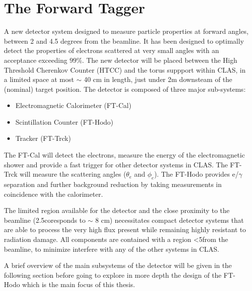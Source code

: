 \section{The Forward Tagger}
A new detector system designed to measure particle properties at forward angles, between 2 and 4.5 degrees from the beamline. It has been designed to optimally detect the properties of electrons scattered at very small angles with an acceptance exceeding $99\%$. \cite{FTTDR2012} The new detector will be placed between the High Threshold Cherenkov Counter (HTCC) and the torus suppport within CLAS, in a limited space at most $\sim$ 40 cm in length, just under 2m downsteam of the (nominal) target position. The detector is composed of three major sub-systems:

\begin{itemize}
	\item	Electromagnetic Calorimeter (FT-Cal)
	\item   Scintillation Counter (FT-Hodo)
	\item   Tracker (FT-Trck)
\end{itemize}

The FT-Cal will detect the electrons, measure the energy of the electromagnetic shower and provide a fast trigger for other detector systems in CLAS. The FT-Trck will measure the scattering angles ($\theta_{e}$ and $\phi_{e}$). The FT-Hodo provides e/$\gamma$ separation and further background reduction by taking measurements in coincidence with the calorimeter.

The limited region available for the detector and the close proximity to the beamline (2.5\textdegree coresponds to $\sim$ 8 cm) necessitates compact detector systems that are able to process the very high flux present while remaining highly resistant to radiation damage. All components are contained with a region \textless5\textdegree from the beamline, to minimize interfere with any of the other systems in CLAS. 

A brief overview of the main subsystems of the detector will be given in the following section before going to explore in more depth the design of the FT-Hodo which is the main focus of this thesis.

